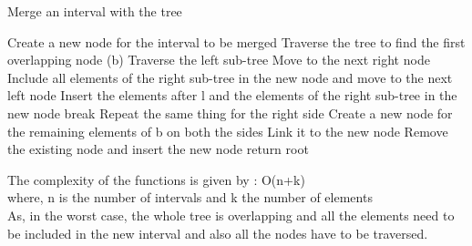 \documentclass[a4paper,11pt]{article}
\begin{document}
\begin{enumerate}
  \begin{algorithm}
    \caption{Merge an interval with the tree}
    \begin{algorithmic}[1]
    \State Create a new node for the interval to be merged
    \State Traverse the tree to find the first overlapping node (b)
        \State Traverse the left sub-tree
            \State Move to the next right node
            \State Include all elements of the right sub-tree in the new node and move to the next left node
        \Else
            \State Insert the elements after l and the elements of the right sub-tree in the new node
            \State break
        \EndIf
    \EndIf
        \State Repeat the same thing for the right side
    \EndIf
        \State Create a new node for the remaining elements of b on both the sides
        \State Link it to the new node
    \EndIf
    \State Remove the existing node and insert the new node
    \State return root
    \end{algorithmic}
  \end{algorithm}
  
  The complexity of the functions is given by : O(n+k)\\
  where, n is the number of intervals and k the number of elements\\
  As, in the worst case, the whole tree is overlapping and all the elements need to be included in the new interval and also all the nodes have to be traversed. 
  
\end{enumerate}
\end{document}
